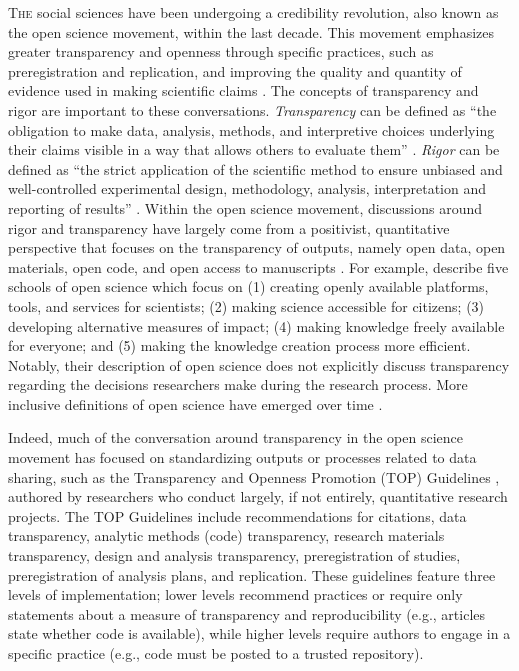 \documentclass[authordate, meta]{jote-new-article}
\begin{document}
\lettrine{T}{he} social sciences have been undergoing a credibility revolution, also known as the open science movement, within the last decade. This movement emphasizes greater transparency and openness through specific practices, such as preregistration and replication, and improving the quality and quantity of evidence used in making scientific claims \parencites{Vazire2018}. The concepts of transparency and rigor are important to these conversations. \emph{Transparency} can be defined as “the obligation to make data, analysis, methods, and interpretive choices underlying their claims visible in a way that allows others to evaluate them” \parencites{Moravcsik2019}. \emph{Rigor }can be defined as “the strict application of the scientific method to ensure unbiased and well-controlled experimental design, methodology, analysis, interpretation and reporting of results” \parencites{NIHND}. Within the open science movement, discussions around rigor and transparency have largely come from a positivist, quantitative perspective that focuses on the transparency of outputs, namely open data, open materials, open code, and open access to manuscripts \parencites{Hagger2019}{Lyon2016}{Powers2019}. For example, \textcite{Fecher2014} describe five schools of open science which focus on (1) creating openly available platforms, tools, and services for scientists; (2) making science accessible for citizens; (3) developing alternative measures of impact; (4) making knowledge freely available for everyone; and (5) making the knowledge creation process more efficient. Notably, their description of open science does not explicitly discuss transparency regarding the decisions researchers make during the research process. More inclusive definitions of open science have emerged over time \parencites[e.g., United Nations Educational, Scientific and Cultural][]{Organization2021}.



Indeed, much of the conversation around transparency in the open science movement has focused on standardizing outputs or processes related to data sharing, such as the Transparency and Openness Promotion (TOP) Guidelines \parencites{Nosek2015}, authored by researchers who conduct largely, if not entirely, quantitative research projects. The TOP Guidelines include recommendations for citations, data transparency, analytic methods (code) transparency, research materials transparency, design and analysis transparency, preregistration of studies, preregistration of analysis plans, and replication. These guidelines feature three levels of implementation; lower levels recommend practices or require only statements about a measure of transparency and reproducibility (e.g., articles state whether code is available), while higher levels require authors to engage in a specific practice (e.g., code must be posted to a trusted repository).
\end{document}
